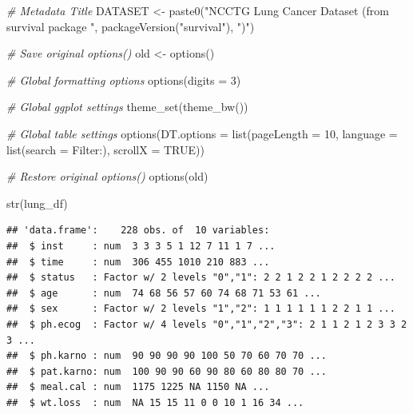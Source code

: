 \documentclass[
]{article}
\newenvironment{Shaded}{\begin{snugshade}}{\end{snugshade}}
\newcommand{\AttributeTok}[1]{\textcolor[rgb]{0.77,0.63,0.00}{#1}}
\newcommand{\CommentTok}[1]{\textcolor[rgb]{0.56,0.35,0.01}{\textit{#1}}}
\newcommand{\ConstantTok}[1]{\textcolor[rgb]{0.00,0.00,0.00}{#1}}
\newcommand{\DecValTok}[1]{\textcolor[rgb]{0.00,0.00,0.81}{#1}}
\newcommand{\FunctionTok}[1]{\textcolor[rgb]{0.00,0.00,0.00}{#1}}
\newcommand{\NormalTok}[1]{#1}
\newcommand{\OtherTok}[1]{\textcolor[rgb]{0.56,0.35,0.01}{#1}}
\newcommand{\StringTok}[1]{\textcolor[rgb]{0.31,0.60,0.02}{#1}}
\begin{document}
\begin{Shaded}
\begin{Highlighting}[]
\CommentTok{\# Metadata Title}
\NormalTok{DATASET }\OtherTok{\textless{}{-}} \FunctionTok{paste0}\NormalTok{(}\StringTok{"NCCTG Lung Cancer Dataset (from survival package "}\NormalTok{, }
                  \FunctionTok{packageVersion}\NormalTok{(}\StringTok{"survival"}\NormalTok{), }\StringTok{")"}\NormalTok{)}

\CommentTok{\# Save original options()}
\NormalTok{old }\OtherTok{\textless{}{-}} \FunctionTok{options}\NormalTok{()  }

\CommentTok{\# Global formatting options}
\FunctionTok{options}\NormalTok{(}\AttributeTok{digits =} \DecValTok{3}\NormalTok{)}

\CommentTok{\# Global ggplot settings}
\FunctionTok{theme\_set}\NormalTok{(}\FunctionTok{theme\_bw}\NormalTok{())}

\CommentTok{\# Global table settings }
\FunctionTok{options}\NormalTok{(}\AttributeTok{DT.options =} \FunctionTok{list}\NormalTok{(}\AttributeTok{pageLength =} \DecValTok{10}\NormalTok{, }
                          \AttributeTok{language =} \FunctionTok{list}\NormalTok{(}\AttributeTok{search =} \StringTok{\textquotesingle{}Filter:\textquotesingle{}}\NormalTok{), }
                          \AttributeTok{scrollX =} \ConstantTok{TRUE}\NormalTok{))}

\CommentTok{\# Restore original options()}
\FunctionTok{options}\NormalTok{(old)}
\end{Highlighting}
\end{Shaded}

\begin{Shaded}
\begin{Highlighting}[]
\FunctionTok{str}\NormalTok{(lung\_df)}
\end{Highlighting}
\end{Shaded}

\begin{verbatim}
## 'data.frame':    228 obs. of  10 variables:
##  $ inst     : num  3 3 3 5 1 12 7 11 1 7 ...
##  $ time     : num  306 455 1010 210 883 ...
##  $ status   : Factor w/ 2 levels "0","1": 2 2 1 2 2 1 2 2 2 2 ...
##  $ age      : num  74 68 56 57 60 74 68 71 53 61 ...
##  $ sex      : Factor w/ 2 levels "1","2": 1 1 1 1 1 1 2 2 1 1 ...
##  $ ph.ecog  : Factor w/ 4 levels "0","1","2","3": 2 1 1 2 1 2 3 3 2 3 ...
##  $ ph.karno : num  90 90 90 90 100 50 70 60 70 70 ...
##  $ pat.karno: num  100 90 90 60 90 80 60 80 80 70 ...
##  $ meal.cal : num  1175 1225 NA 1150 NA ...
##  $ wt.loss  : num  NA 15 15 11 0 0 10 1 16 34 ...
\end{verbatim}
\end{document}
